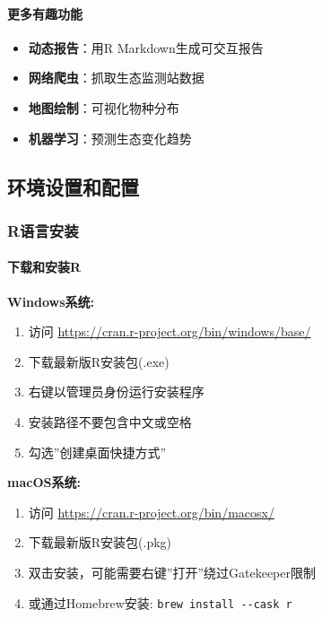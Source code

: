 \documentclass[
]{book}
\providecommand{\tightlist}{%
  \setlength{\itemsep}{0pt}\setlength{\parskip}{0pt}}
\begin{document}
\hypertarget{ux66f4ux591aux6709ux8da3ux529fux80fd}{%
\paragraph{更多有趣功能}\label{ux66f4ux591aux6709ux8da3ux529fux80fd}}

\begin{itemize}
\tightlist
\item
  \textbf{动态报告}：用R Markdown生成可交互报告
\item
  \textbf{网络爬虫}：抓取生态监测站数据
\item
  \textbf{地图绘制}：可视化物种分布
\item
  \textbf{机器学习}：预测生态变化趋势
\end{itemize}

\hypertarget{ux73afux5883ux8bbeux7f6eux548cux914dux7f6e}{%
\subsection{环境设置和配置}\label{ux73afux5883ux8bbeux7f6eux548cux914dux7f6e}}

\hypertarget{rux8bedux8a00ux5b89ux88c5}{%
\subsubsection{R语言安装}\label{rux8bedux8a00ux5b89ux88c5}}

\hypertarget{ux4e0bux8f7dux548cux5b89ux88c5r}{%
\paragraph{下载和安装R}\label{ux4e0bux8f7dux548cux5b89ux88c5r}}

\textbf{Windows系统:}

\begin{enumerate}
\def\labelenumi{\arabic{enumi}.}
\item
  访问 \url{https://cran.r-project.org/bin/windows/base/}
\item
  下载最新版R安装包(.exe)
\item
  右键以管理员身份运行安装程序
\item
  安装路径不要包含中文或空格
\item
  勾选''创建桌面快捷方式''
\end{enumerate}

\textbf{macOS系统:}

\begin{enumerate}
\def\labelenumi{\arabic{enumi}.}
\item
  访问 \url{https://cran.r-project.org/bin/macosx/}
\item
  下载最新版R安装包(.pkg)
\item
  双击安装，可能需要右键''打开''绕过Gatekeeper限制
\item
  或通过Homebrew安装: \texttt{brew\ install\ -\/-cask\ r}
\end{enumerate}
\end{document}
